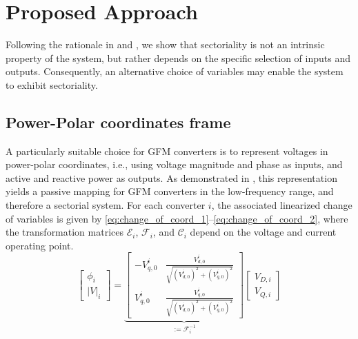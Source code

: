 \section{Proposed Approach}
\label{sec:propo_approch}
Following the rationale in \cite{deyPassivityBasedDecentralizedCriteria2023} and \cite{chenExtendedFrequencyDomainPassivity2025a}, we show that sectoriality is not an intrinsic property of the system, but rather depends on the specific selection of inputs and outputs. Consequently, an alternative choice of variables may enable the system to exhibit sectoriality.

\subsection{Power-Polar coordinates frame}
A particularly suitable choice for GFM converters is to represent voltages in power-polar coordinates, i.e., using voltage magnitude and phase as inputs, and active and reactive power as outputs. As demonstrated in \cite{deyAnalysisPassivityCharacteristics2021}, this representation yields a passive mapping for GFM converters in the low-frequency range, and therefore a sectorial system. For each converter $i$, the associated linearized change of variables is given by \eqref{eq:change_of_coord_1}–\eqref{eq:change_of_coord_2}, where the transformation matrices $\mathcal{E}_i$, $\mathcal{F}_i$, and $\mathcal{C}_i$ depend on the voltage and current operating point.
\begin{equation}
    \begin{bmatrix}
        \phi_i \\ |V|_i 
    \end{bmatrix} =
    \underbrace{\begin{bmatrix}
        -V^i_{q,0} & \frac{V^i_{d,0}}{\sqrt{(V^i_{d,0})^2+(V^i_{q,0})^2}} \\
        V^i_{q,0} & \frac{V^i_{q,0}}{\sqrt{(V^i_{d,0})^2+(V^i_{q,0})^2}}
    \end{bmatrix}}_{:=\mathcal{F}_i^{-1}}
    \begin{bmatrix}
        V_{D,i} \\ V_{Q,i} 
    \end{bmatrix}
    \label{eq:change_of_coord_1}
\end{equation}

